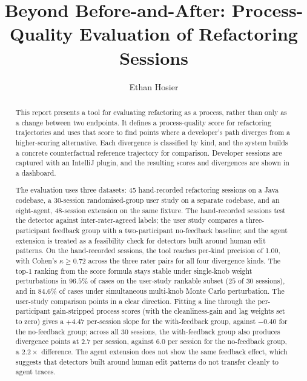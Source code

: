 \documentclass[a4paper, twoside, 11pt]{report}
\title{Beyond Before-and-After: Process-Quality Evaluation of Refactoring Sessions}
\author{Ethan Hosier}
\begin{document}


\begin{abstract}
This report presents a tool for evaluating refactoring as a process, rather than only as a change between two endpoints. It defines a process-quality score for refactoring trajectories and uses that score to find points where a developer's path diverges from a higher-scoring alternative. Each divergence is classified by kind, and the system builds a concrete counterfactual reference trajectory for comparison. Developer sessions are captured with an IntelliJ plugin, and the resulting scores and divergences are shown in a dashboard.

The evaluation uses three datasets: 45 hand-recorded refactoring sessions on a Java codebase, a 30-session randomised-group user study on a separate codebase, and an eight-agent, 48-session extension on the same fixture. The hand-recorded sessions test the detector against inter-rater-agreed labels; the user study compares a three-participant feedback group with a two-participant no-feedback baseline; and the agent extension is treated as a feasibility check for detectors built around human edit patterns. On the hand-recorded sessions, the tool reaches per-kind precision of 1.00, with Cohen's $\kappa \geq 0.72$ across the three rater pairs for all four divergence kinds. The top-$1$ ranking from the score formula stays stable under single-knob weight perturbations in $96.5\%$ of cases on the user-study rankable subset ($25$ of $30$ sessions), and in $84.6\%$ of cases under simultaneous multi-knob Monte Carlo perturbation. The user-study comparison points in a clear direction. Fitting a line through the per-participant gain-stripped process scores (with the cleanliness-gain and lag weights set to zero) gives a $+4.47$ per-session slope for the with-feedback group, against $-0.40$ for the no-feedback group; across all $30$ sessions, the with-feedback group also produces divergence points at $2.7$ per session, against $6.0$ per session for the no-feedback group, a $2.2\times$ difference. The agent extension does not show the same feedback effect, which suggests that detectors built around human edit patterns do not transfer cleanly to agent traces.
\end{abstract}

\tableofcontents











\end{document}
